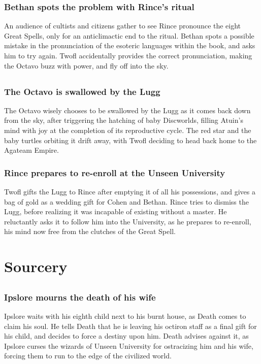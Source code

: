 \subsubsection{\Gls{Bethan} spots the problem with \Gls{Rince}'s ritual}
An audience of cultists and citizens gather to see \Gls{Rince} pronounce the eight Great Spells,
only for an anticlimactic end to the ritual. \Gls{Bethan} spots a possible mistake in the
pronunciation of the esoteric languages within the book, and asks him to try again. \Gls{Twofl}
accidentally provides the correct pronunciation, making the Octavo buzz with power, and fly off into
the sky.

\subsection{}
\subsubsection{The Octavo is swallowed by the \Gls{Lugg}}
The Octavo wisely chooses to be swallowed by the \Gls{Lugg} as it comes back down from the sky,
after triggering the hatching of baby Discworlds, filling \Gls{Atuin}'s mind with joy at the
completion of its reproductive cycle. The red star and the baby turtles orbiting it drift away,
with \Gls{Twofl} deciding to head back home to the Agateam Empire.

\subsubsection{\Gls{Rince} prepares to re-enroll at the Unseen University}
\Gls{Twofl} gifts the \Gls{Lugg} to \Gls{Rince} after emptying it of all his possessions, and gives
a bag of gold as a wedding gift for \Gls{Cohen} and \Gls{Bethan}. \Gls{Rince} tries to dismiss the
\Gls{Lugg}, before realizing it was incapable of existing without a master. He reluctantly asks it
to follow him into the University, as he prepares to re-enroll, his mind now free from the clutches
of the Great Spell.


\section{Sourcery}


\subsection{}
\subsubsection{\Gls{Ipslore} mourns the death of his wife}
\Gls{Ipslore} waits with his eighth child next to his burnt house, as \Gls{Death} comes to claim
his soul. He tells \Gls{Death} that he is leaving his octiron staff as a final gift for his
child, and decides to force a destiny upon him. \Gls{Death} advises against it, as \Gls{Ipslore}
curses the wizards of Unseen University for ostracizing him and his wife, forcing them to run to
the edge of the civilized world.

